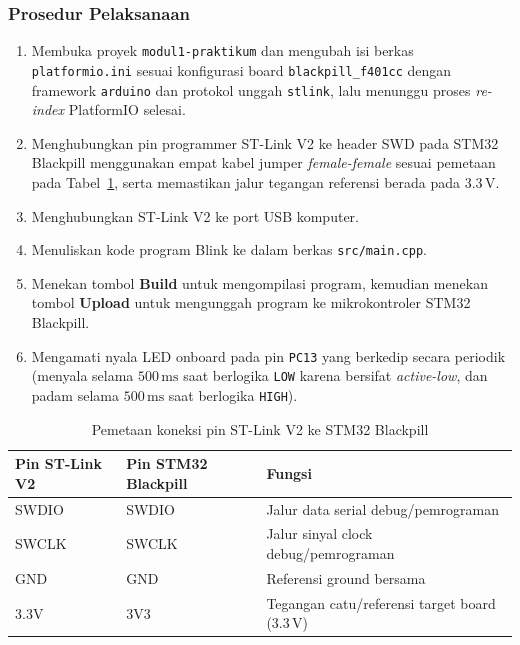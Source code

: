\subsubsection*{Prosedur Pelaksanaan}
\begin{enumerate}[label=\arabic*.]
    \item Membuka proyek \texttt{modul1-praktikum} dan mengubah isi berkas \texttt{platformio.ini} sesuai konfigurasi board \texttt{blackpill\_f401cc} dengan framework \texttt{arduino} dan protokol unggah \texttt{stlink}, lalu menunggu proses \textit{re-index} PlatformIO selesai.
    \item Menghubungkan pin programmer ST-Link V2 ke header SWD pada STM32 Blackpill menggunakan empat kabel jumper \textit{female-female} sesuai pemetaan pada Tabel~\ref{tab:wiring_stlink}, serta memastikan jalur tegangan referensi berada pada $3.3\,\text{V}$.
    \item Menghubungkan ST-Link V2 ke port USB komputer.
    \item Menuliskan kode program Blink ke dalam berkas \texttt{src/main.cpp}.
    \item Menekan tombol \textbf{Build} untuk mengompilasi program, kemudian menekan tombol \textbf{Upload} untuk mengunggah program ke mikrokontroler STM32 Blackpill.
    \item Mengamati nyala LED onboard pada pin \texttt{PC13} yang berkedip secara periodik (menyala selama $500\,\text{ms}$ saat berlogika \texttt{LOW} karena bersifat \textit{active-low}, dan padam selama $500\,\text{ms}$ saat berlogika \texttt{HIGH}).
\end{enumerate}

\begin{table}[htbp]
    \centering
    \caption{Pemetaan koneksi pin ST-Link V2 ke STM32 Blackpill}
    \label{tab:wiring_stlink}
    \begin{tabular}{l l l}
        \toprule
        \textbf{Pin ST-Link V2} & \textbf{Pin STM32 Blackpill} & \textbf{Fungsi} \\
        \midrule
        SWDIO & SWDIO & Jalur data serial debug/pemrograman \\
        SWCLK & SWCLK & Jalur sinyal clock debug/pemrograman \\
        GND   & GND   & Referensi ground bersama \\
        3.3V  & 3V3   & Tegangan catu/referensi target board ($3.3\,\text{V}$) \\
        \bottomrule
    \end{tabular}
\end{table}


